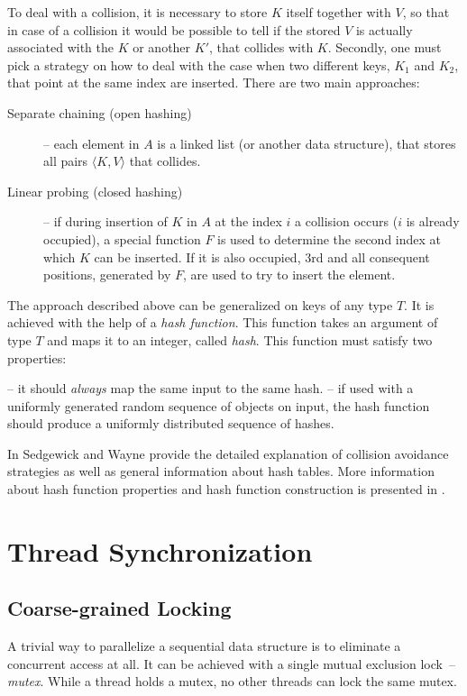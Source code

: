 To deal with a collision, it is necessary to store $K$ itself together with $V$, so that in case of a collision it would be possible to tell if the stored $V$ is actually associated with the $K$ or another $K'$, that collides with $K$. Secondly, one must pick a strategy on how to deal with the case when two different keys, $K_1$ and $K_2$, that point at the same index are inserted. There are two main approaches:
\begin{description}
\item[Separate chaining (open hashing)]-- each element in $A$ is a linked list (or another data structure), that stores all pairs $\langle K, V\rangle$ that collides.
\pagebreak
\item[Linear probing (closed hashing)]-- if during insertion of $K$ in $A$ at the index $i$ a collision occurs ($i$ is already occupied), a special function $F$ is used to determine the second index at which $K$ can be inserted. If it is also occupied, 3rd and all consequent positions, generated by $F$, are used to try to insert the element.
\end{description}

The approach described above can be generalized on keys of any type $T$. It is achieved with the help of a \emph{hash function}. This function takes an argument of type $T$ and maps it to an integer, called \emph{hash}. This function must satisfy two properties:

\begin{block-description}
\blockitem[Determinism]-- it should \emph{always} map the same input to the same hash.
\blockitem[Uniformity]-- if used with a uniformly generated random sequence of objects on input, the hash function should produce a uniformly distributed sequence of hashes.
\end{block-description}

In \cite[p.~464]{sedgewick} Sedgewick and Wayne provide the detailed explanation of collision avoidance strategies as well as general information about hash tables. More information about hash function properties and hash function construction is presented in \cite{knott}.

\section{Thread Synchronization}



\subsection{Coarse-grained Locking}
\label{sec:cgl}
A trivial way to parallelize a sequential data structure is to eliminate a concurrent access at all. It can be achieved with a single mutual exclusion lock~-- \emph{mutex}.
While a thread holds a mutex, no other threads can lock the same mutex.

